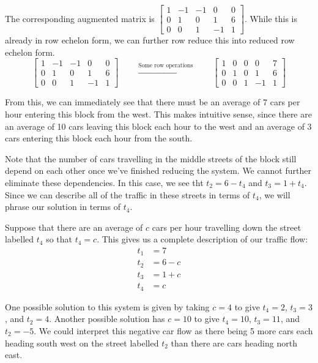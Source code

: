 \begin{example}
		The corresponding augmented matrix is $\begin{bmatrix} 1 & -1 & -1 & 0 & 0 \\ 0 & 1 & 0 & 1 & 6 \\ 0 & 0 & 1 & -1 & 1\end{bmatrix}$. While this is already in row echelon form, we can further row reduce this into reduced row echelon form.
		\[
			\begin{bmatrix} 1 & -1 & -1 & 0 & 0 \\ 0 & 1 & 0 & 1 & 6 \\ 0 & 0 & 1 & -1 & 1\end{bmatrix}\qquad \xrightarrow{\text{Some row operations}} \qquad
			\begin{bmatrix} 1 & 0 & 0 & 0 & 7 \\ 0 & 1 & 0 & 1 & 6 \\ 0 & 0 & 1 & -1 & 1\end{bmatrix}
		\]
		
		From this, we can immediately see that there must be an average of 7 cars per hour entering this block from the west. This makes intuitive sense, since there are an average of 10 cars leaving this block each hour to the west and an average of 3 cars entering this block each hour from the south.

		Note that the number of cars travelling in the middle streets of the block still depend on each other once we've finished reducing the system. We cannot further eliminate these dependencies. In this case, we see tht $t_2 = 6 - t_4$ and $t_3 = 1 + t_4$. Since we can describe all of the traffic in these streets in terms of $t_4$, we will phrase our solution in terms of $t_4$. 
		
		Suppose that there are an average of $c$ cars per hour travelling down the street labelled $t_4$ so that $t_4 = c$. This gives us a complete description of our traffic flow:
		\begin{align*}
			t_1 &= 7\\
			t_2 &= 6 - c\\
			t_3 &= 1 + c\\
			t_4 &= c
		\end{align*}
		
		One possible solution to this system is given by taking $c = 4$ to give $t_4 = 2$, $t_3 = 3$, and $t_2 = 4$. Another possible solution has $c = 10$ to give $t_4 = 10$, $t_3 = 11$, and $t_2 = -5$. We could interpret this negative car flow as there being 5 more cars each heading south west on the street labelled $t_2$ than there are cars heading north east.
		
\end{example}

